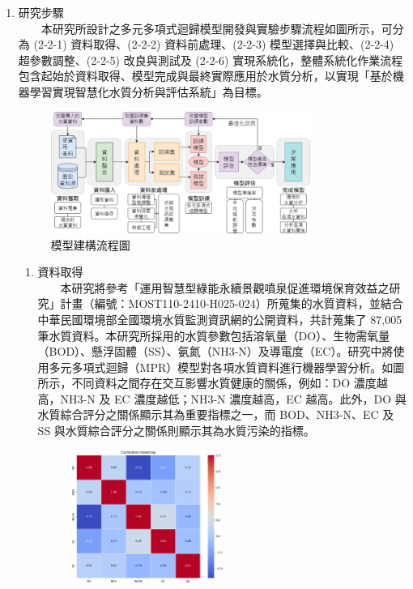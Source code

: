 \documentclass[12pt,a4paper]{article}
\begin{document}
\begin{enumerate}
\begin{enumerate}[label=\arabic*.]
\begin{enumerate}[label=2-1-\arabic*.]
    \end{enumerate}
\item 研究步驟\\
　　本研究所設計之多元多項式迴歸模型開發與實驗步驟流程如圖所示，可分為 (2-2-1) 資料取得、(2-2-2) 資料前處理、(2-2-3) 模型選擇與比較、(2-2-4) 超參數調整、(2-2-5) 改良與測試及 (2-2-6) 實現系統化，整體系統化作業流程包含起始於資料取得、模型完成與最終實際應用於水質分析，以實現「基於機器學習實現智慧化水質分析與評估系統」為目標。
    \begin{figure}[H]
        \centering
        \includegraphics[width=0.8\textwidth]{resources/image/模型建構流程圖.png}
        \caption{模型建構流程圖}
        \label{fig:research_steps}
    \end{figure}
    \begin{enumerate}[label=2-2-\arabic*.]
        \item 資料取得\\
        　　本研究將參考「運用智慧型綠能永續景觀噴泉促進環境保育效益之研究」計畫（編號：MOST110-2410-H025-024）所蒐集的水質資料，並結合中華民國環境部全國環境水質監測資訊網的公開資料，共計蒐集了 87,005 筆水質資料。本研究所採用的水質參數包括溶氧量（DO）、生物需氧量（BOD）、懸浮固體（SS）、氨氮（NH3-N）及導電度（EC）。研究中將使用多元多項式迴歸（MPR）模型對各項水質資料進行機器學習分析。如圖所示，不同資料之間存在交互影響水質健康的關係，例如：DO 濃度越高，NH3-N 及 EC 濃度越低；NH3-N 濃度越高，EC 越高。此外，DO 與水質綜合評分之關係顯示其為重要指標之一，而 BOD、NH3-N、EC 及 SS 與水質綜合評分之關係則顯示其為水質污染的指標。
            \begin{figure}[H]
                \centering
                \includegraphics[width=0.5\textwidth]{resources/image/heatmap.png}

\end{figure}
\end{enumerate}
\end{enumerate}
\end{enumerate}
\end{document}
